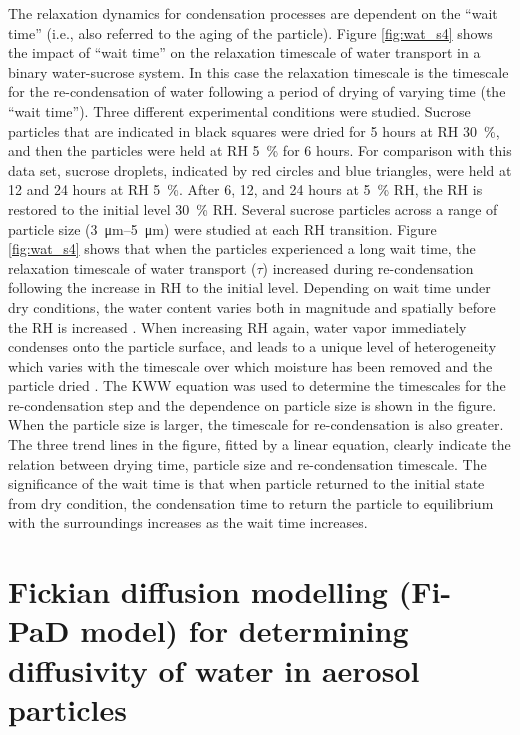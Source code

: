 The relaxation dynamics for condensation processes are dependent on the ``wait time'' (i.e., also referred to the aging of the particle). Figure \ref{fig:wat_s4} shows the impact of ``wait time'' on the relaxation timescale of water transport in a binary water-sucrose system. In this case the relaxation timescale is the timescale for the re-condensation of water following a period of drying of varying time (the ``wait time''). Three different experimental conditions were studied. Sucrose particles that are indicated in black squares were dried for \num{5} hours at RH \SI{30}{\percent}, and then the particles were held at RH \SI{5}{\percent} for \num{6} hours. For comparison with this data set, sucrose droplets, indicated by red circles and blue triangles, were held at \num{12} and \num{24} hours at RH \SI{5}{\percent}. After \num{6}, \num{12}, and \num{24} hours at \SI{5}{\percent} RH, the RH is restored to the initial level \SI{30}{\percent} RH. Several sucrose particles across a range of particle size (\SIrange[range-phrase=\text{--}]{3}{5}{\micro\meter}) were studied at each RH transition. Figure \ref{fig:wat_s4} shows that when the particles experienced a long wait time, the relaxation timescale of water transport ($\tau$) increased during re-condensation following the increase in RH to the initial level. Depending on wait time under dry conditions, the water content varies both in magnitude and spatially before the RH is increased \cite{Rickards2015}. When increasing RH again, water vapor immediately condenses onto the particle surface, and leads to a unique level of heterogeneity which varies with the timescale over which moisture has been removed and the particle dried \cite{Rickards2015,luTimescalesWaterTransport2014}. The KWW equation was used to determine the timescales for the re-condensation step and the dependence on particle size is shown in the figure. When the particle size is larger, the timescale for re-condensation is also greater. The three trend lines in the figure, fitted by a linear equation, clearly indicate the relation between drying time, particle size and re-condensation timescale. The significance of the wait time is that when particle returned to the initial state from dry condition, the condensation time to return the particle to equilibrium with the surroundings increases as the wait time increases. 

\section{Fickian diffusion modelling (Fi-PaD model) for determining diffusivity of water in aerosol particles}

